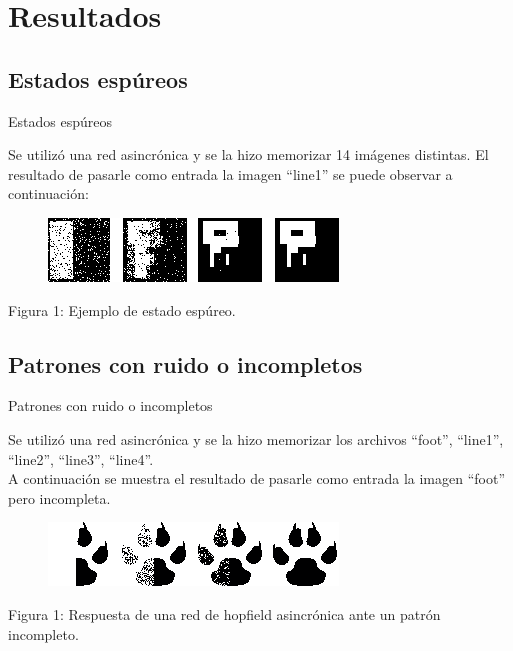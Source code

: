 \documentclass{beamer}
\begin{document}
\section{Resultados}

\subsection{Estados espúreos}
\begin{frame}{Estados espúreos}

\par Se utilizó una red asincrónica y se la hizo memorizar 14 imágenes distintas. 
El resultado de pasarle como entrada la imagen ``line1'' se puede observar a continuación:\\

\begin{figure}[H]
\begin{center}
\includegraphics[scale=0.75]{./images/espureo.png}
\label{modelado}
\end{center}
\end{figure}

\begin{center}
\par Figura 1: Ejemplo de estado espúreo.
\end{center}

\end{frame}

\subsection{Patrones con ruido o incompletos}
\begin{frame}{Patrones con ruido o incompletos}


\par Se utilizó una red asincrónica y se la hizo memorizar los archivos ``foot'', ``line1'', ``line2'', ``line3'', ``line4''.\\

A continuación se muestra el resultado de pasarle como entrada la imagen ``foot'' pero incompleta.\\

\begin{figure}[H]
\begin{center}
\includegraphics[scale=0.75]{./images/half.png}
\label{modelado}
\end{center}
\end{figure}

\begin{center}
\par Figura 1: Respuesta de una red de hopfield asincrónica ante un patrón incompleto.
\end{center}

\end{frame}
\end{document}
